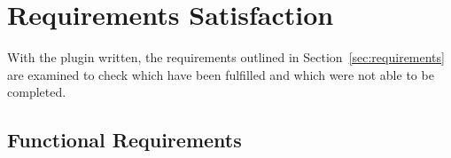 
\section{Requirements Satisfaction}
\label{sec:requirements_satisfaction}

With the plugin written, the requirements outlined in
Section~\ref{sec:requirements} are examined to check which have been fulfilled
and which were not able to be completed.

\subsection{Functional Requirements}
\label{sub:functional_requirements}

